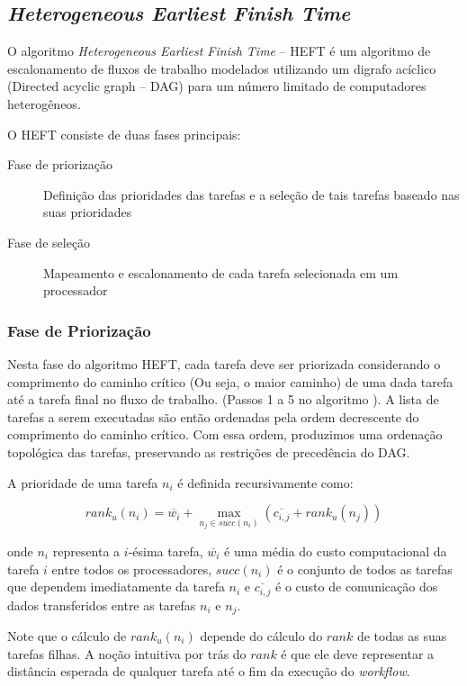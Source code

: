 \subsection{\emph{Heterogeneous Earliest Finish Time}}
\label{subsec:heft}
O algoritmo \emph{Heterogeneous Earliest Finish Time} -- HEFT é um algoritmo de
escalonamento de fluxos de trabalho modelados utilizando um digrafo acíclico
(Directed acyclic graph -- DAG) para um número limitado de computadores
heterogêneos. \cite{kim:virtual_computing}

O HEFT consiste de duas fases principais:

\begin{description}
	\item[Fase de priorização] Definição das prioridades das tarefas e a seleção
	de tais tarefas baseado nas suas prioridades
	\item[Fase de seleção] Mapeamento e escalonamento de cada tarefa selecionada
	em um processador
\end{description}

\subsubsection{Fase de Priorização}
Nesta fase do algoritmo HEFT, cada tarefa deve ser priorizada considerando
o comprimento do caminho crítico (Ou seja, o maior caminho) de uma dada tarefa
até a tarefa final no fluxo de trabalho. (Passos 1 a 5 no algoritmo 
). A lista de tarefas a serem
executadas são então ordenadas pela ordem decrescente do comprimento do caminho
crítico. Com essa ordem, produzimos uma ordenação topológica das tarefas, 
preservando as restrições de precedência do DAG.

A prioridade de uma tarefa $n_i$ é definida recursivamente como:

$$ rank_u(n_i) = \overline{w_i} + \max_{n_j \in succ(n_i)} (\overline{c_{i,j}} + rank_u(n_j)) $$

onde $n_i$ representa a $i$-ésima tarefa, $\overline{w_i}$ é uma média
do custo computacional da tarefa $i$ entre todos os processadores, $succ(n_i)$ 
é o conjunto de todos as tarefas que dependem imediatamente da tarefa $n_i$
e $\overline{c_{i,j}}$ é o custo de comunicação dos dados transferidos entre 
as tarefas $n_i$ e $n_j$. %

Note que o cálculo de $rank_u(n_i)$ depende do cálculo do $rank$ de todas as
suas tarefas filhas. A noção intuitiva por trás do $rank$ é que ele deve
representar a distância esperada de qualquer tarefa até o fim da execução do
\emph{workflow}.


